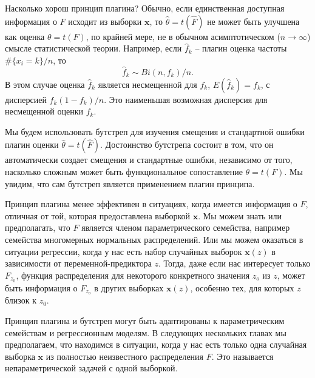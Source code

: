 Насколько хорош принцип плагина? Обычно, если единственная доступная информация о $F$ исходит из выборки $\mathbf{x}$, то $\hat\theta = t (\hat F)$ не может быть улучшена как оценка $\theta = t (F)$, по крайней мере, не в обычном асимптотическом ($n\rightarrow\infty$) смысле статистической теории. Например, если $\hat f_k$ -- плагин оценка частоты $\#\{x_i = k\} / n$, то 
\begin{equation}
    \hat f_k\sim Bi(n,f_k)/n.
\end{equation}
В этом случае оценка $\hat f_k$ является несмещенной для $f_k$, $E(\hat f_k) = f_k$, с дисперсией $f_k (1-f_k) / n$. Это наименьшая возможная дисперсия для несмещенной оценки $f_k$. 

Мы будем использовать бутстреп для изучения смещения и стандартной ошибки плагин оценки $\hat\theta = t (\hat F)$. Достоинство бутстрепа состоит в том, что он автоматически создает смещения и стандартные ошибки, независимо от того, насколько сложным может быть функциональное сопоставление $\theta = t (F)$. Мы увидим, что сам бутстреп является применением плагин принципа. 

Принцип плагина менее эффективен в ситуациях, когда имеется информация о $F$, отличная от той, которая предоставлена выборкой $\mathbf{x}$. Мы можем знать или предполагать, что $F$ является членом параметрического семейства, например семейства многомерных нормальных распределений. Или мы можем оказаться в ситуации регрессии, когда у нас есть набор случайных выборок $\mathbf{x} (z)$ в зависимости от переменной-предиктора $z$. Тогда, даже если нас интересует только $F_{z_0}$, функция распределения для некоторого конкретного значения $z_o$ из $z$, может быть информация о $F_{z_o}$ в других выборках $\mathbf{x} (z)$, особенно тех, для которых $z$ близок к $z_0$.

Принцип плагина и бутстреп могут быть адаптированы к параметрическим семействам и регрессионным моделям. В следующих нескольких главах мы предполагаем, что находимся в ситуации, когда у нас есть только одна случайная выборка $\mathbf{x}$ из полностью неизвестного распределения $F$. Это называется непараметрической задачей с одной выборкой.